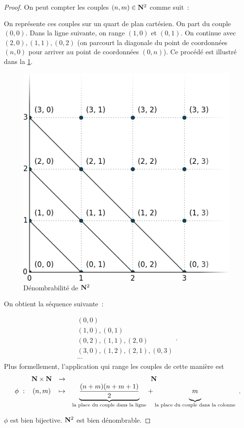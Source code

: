 \documentclass[a4paper,french,final]{memoir}
\begin{document}
\begin{proof} 
	On peut compter les couples $(n,m) \in \mathbf{N}^2$ comme suit~: \par On représente ces couples sur un quart de plan cartésien. 
	On part du couple $(0, 0)$. Dans la ligne suivante, on range $(1,0) $ et $(0,1)$. On continue avec $(2,0), (1,1), (0,2)$ (on parcourt la diagonale du point de coordonnées $(n,0)$ pour arriver au point de coordonnées $(0,n)$). Ce procédé est illustré dans la  \cref{fig:n_croix_n}.
	\begin{figure}[htb]
		\centering
		\includegraphics[scale=0.3]{n_croix_n.png}
		\caption{Dénombrabilité de $\mathbf{N}^2$}
		\label{fig:n_croix_n}
	\end{figure}
	
	On obtient la séquence suivante~:
	
	\[\begin{array}{l}
		(0,0) \\
		(1,0), (0,1) \\
		(0,2), (1,1), (2,0) \\
		(3,0), (1,2), (2,1), (0,3) \\
		\cdots
	\end{array}.\]
	Plus formellement, l'application qui range les couples de cette manière est 
	\[\begin{array}{cccc}
		\ & \NN \times \NN & \to & \NN \\
		\phi~: & (n,m) & \mapsto & {\underbrace{\frac{(n+m)(n+m+1)}{2}}_{\text{la place du couple dans la ligne}}} +  {\underbrace{\vphantom{\frac{(n+m)(n+m+1)}{2}} m}_{\text{la place du couple dans la colonne}}}
	\end{array}.\]
	
	
	$\phi$ est bien bijective. $\mathbf{N}^2$ est bien dénombrable.
\end{proof}
\end{document}
